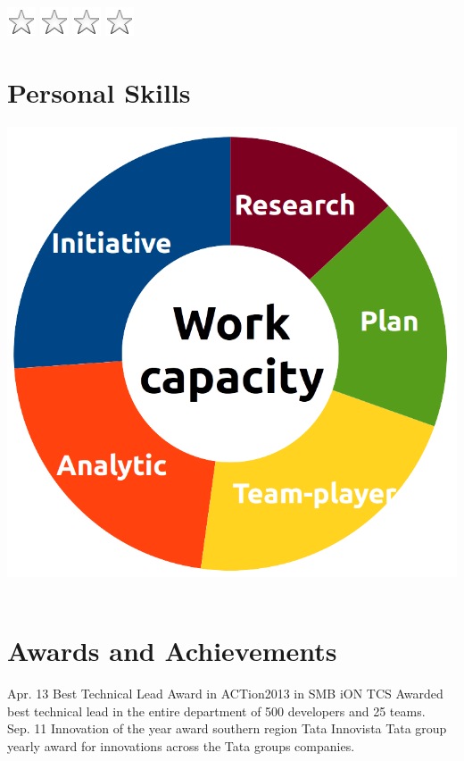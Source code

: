 \documentclass[]{cv-class}
\begin{document}
\begin{aside}
{    \includegraphics[scale=0.30]{img/star_empty.png}
    \includegraphics[scale=0.30]{img/star_empty.png}
    \includegraphics[scale=0.30]{img/star_empty.png}
    \includegraphics[scale=0.30]{img/star_empty.png}}
    ~
   \section{Personal Skills}
    \includegraphics[scale=0.20]{img/personal.png}
    ~
\end{aside}

\section{Awards and Achievements}
\begin{entrylist}
  \entry
    {Apr. 13}
    {Best Technical Lead Award in ACTion2013 in SMB iON}
    {TCS}
    {Awarded best technical lead in the entire department of 500 developers and 25 teams.\\}
      \entry
    {Sep. 11}
    {Innovation of the year award southern region}
    {Tata Innovista}
    {Tata group yearly award for innovations across the Tata groups  companies.\\}
   
\end{entrylist}
\end{document}
